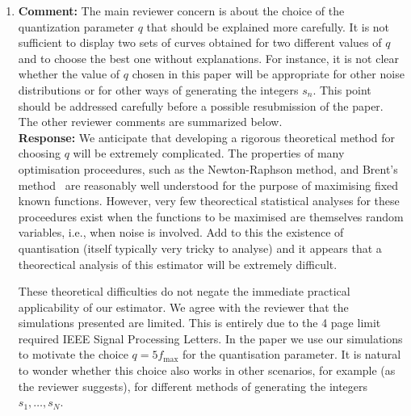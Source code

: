 \documentclass[a4paper,10pt]{article}
\begin{document}
\begin{enumerate}
\item\textbf{Comment:}
The main reviewer concern is about the choice of the quantization parameter
$q$ that should be explained more carefully. It is not suﬃcient to display two sets
of curves obtained for two diﬀerent values of $q$ and to choose the best one without
explanations. For instance, it is not clear whether the value of $q$ chosen in this paper
will be appropriate for other noise distributions or for other ways of generating the
integers $s_n$. This point should be addressed carefully before a possible resubmission
of the paper. The other reviewer comments are summarized below.
\\
\textbf{Response:}
We anticipate that developing a rigorous theoretical method for choosing $q$ will be extremely complicated.  The properties of many optimisation proceedures, such as the Newton-Raphson method, and Brent's method~\cite[Ch.~5]{Brent_opt_no_derivs_1973} are reasonably well understood for the purpose of maximising fixed known functions. However, very few theorectical statistical analyses for these proceedures exist when the functions to be maximised are themselves random variables, i.e., when noise is involved.  Add to this the existence of quantisation (itself typically very tricky to analyse) and it appears that a theorectical analysis of this estimator will be extremely difficult.

These theoretical difficulties do not negate the immediate practical applicability of our estimator.  We agree with the reviewer that the simulations presented are limited. This is entirely due to the 4 page limit required IEEE Signal Processing Letters.  In the paper we use our simulations to motivate the choice $q = 5 f_{\text{max}}$ for the quantisation parameter.  It is natural to wonder whether this choice also works in other scenarios, for example (as the reviewer suggests), for different methods of generating the integers $s_1,\dots,s_N$.



\end{enumerate}
\end{document}
